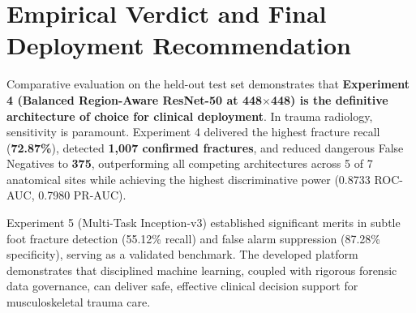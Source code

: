 \documentclass[12pt, a4paper]{report}
\begin{document}
\section{Empirical Verdict and Final Deployment Recommendation}
Comparative evaluation on the held-out test set demonstrates that \textbf{Experiment 4 (Balanced Region-Aware ResNet-50 at 448$\times$448) is the definitive architecture of choice for clinical deployment}. In trauma radiology, sensitivity is paramount. Experiment 4 delivered the highest fracture recall (\textbf{72.87\%}), detected \textbf{1,007 confirmed fractures}, and reduced dangerous False Negatives to \textbf{375}, outperforming all competing architectures across 5 of 7 anatomical sites while achieving the highest discriminative power (0.8733 ROC-AUC, 0.7980 PR-AUC).

Experiment 5 (Multi-Task Inception-v3) established significant merits in subtle foot fracture detection (55.12\% recall) and false alarm suppression (87.28\% specificity), serving as a validated benchmark. The developed platform demonstrates that disciplined machine learning, coupled with rigorous forensic data governance, can deliver safe, effective clinical decision support for musculoskeletal trauma care.
\end{document}
